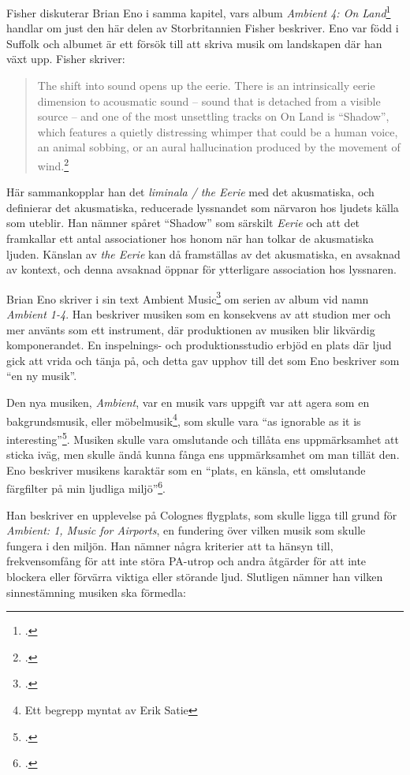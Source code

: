 \documentclass{article}
\begin{document}
Fisher diskuterar Brian Eno i samma kapitel, vars album \emph{Ambient 4: On Land}\footcite{EnoLand} handlar om
just den här delen av Storbritannien Fisher beskriver. Eno var född i Suffolk och albumet är ett försök till
att skriva musik om landskapen där han växt upp. Fisher skriver:
\pagebreak
\begin{quote}
The shift into sound opens up the eerie. There is an intrinsically eerie dimension to acousmatic sound -- sound
that is detached from a visible source -- and one of the most unsettling tracks on On Land is ``Shadow'', which
features a quietly distressing whimper that could be a human voice, an animal sobbing, or an aural
hallucination produced by the movement of wind.\footcite[81]{Fisher}
\end{quote}
Här sammankopplar han det \emph{liminala / the Eerie} med det akusmatiska, och definierar det akusmatiska,
reducerade lyssnandet som närvaron hos ljudets källa som uteblir. Han nämner spåret ``Shadow'' som särskilt
\emph{Eerie} och att det framkallar ett antal associationer hos honom när han tolkar de akusmatiska ljuden.
Känslan av \emph{the Eerie} kan då framställas av det akusmatiska, en avsaknad av kontext, och denna avsaknad
öppnar för ytterligare association hos lyssnaren.

Brian Eno skriver i sin text Ambient Music\footcite[149-153]{Eno} om serien av album vid namn \emph{Ambient
1-4}. Han beskriver musiken som en konsekvens av att studion mer och mer använts som ett instrument, där
produktionen av musiken blir likvärdig komponerandet. En inspelnings- och produktionsstudio erbjöd en plats
där ljud gick att vrida och tänja på, och detta gav upphov till det som Eno beskriver som ``en ny musik''.

Den nya musiken, \emph{Ambient}, var en musik vars uppgift var att agera som en bakgrundsmusik, eller
möbelmusik\footnote{Ett begrepp myntat av Erik Satie}, som skulle vara ``as ignorable as it is
interesting''\footcite{Airports}. Musiken skulle vara omslutande och tillåta ens uppmärksamhet att sticka
iväg, men skulle ändå kunna fånga ens uppmärksamhet om man tillät den. Eno beskriver musikens karaktär som en
``plats, en känsla, ett omslutande färgfilter på min ljudliga miljö''\footcite[Egen översättning, s. 151]{Eno}.

Han beskriver en upplevelse på Colognes flygplats, som skulle ligga till grund för \emph{Ambient: 1, Music for
Airports}, en fundering över vilken musik som skulle fungera i den miljön. Han nämner några kriterier att ta
hänsyn till, frekvensomfång för att inte störa PA-utrop och andra åtgärder för att inte blockera eller
förvärra viktiga eller störande ljud. Slutligen nämner han vilken sinnestämning musiken ska förmedla:
\end{document}
